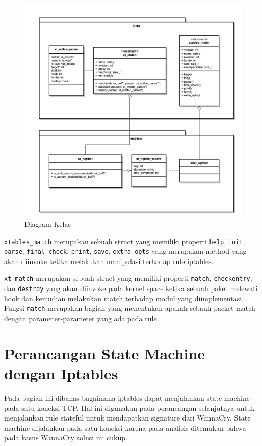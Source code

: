 \begin{figure}[H]
	\centering
	\includegraphics[width=\textwidth]{resources/ngfilter_class_diagram.png}
	\caption{Diagram Kelas}
	\label{fig:class_diagram}
\end{figure}

\verb|xtables_match| merupakan sebuah struct yang memiliki properti \verb|help|, \verb|init|, \verb|parse|, \verb|final_check|, \verb|print|, \verb|save|, \verb|extra_opts| yang merupakan method yang akan diinvoke ketika melakukan manipulasi terhadap rule iptables.

\verb|xt_match| merupakan sebuah struct yang memiliki properti \verb|match|, \verb|checkentry|, dan \verb|destroy| yang akan diinvoke pada kernel space ketika sebuah paket melewati hook dan kemudian melakukan match terhadap modul yang diimplementasi. Fungsi \verb|match| merupakan bagian yang menentukan apakah sebauh packet match dengan parameter-parameter yang ada pada rule.

\section{Perancangan State Machine dengan Iptables}

Pada bagian ini dibahas bagaimana iptables dapat menjalankan state machine pada satu koneksi TCP. Hal ini digunakan pada perancangan selanjutnya untuk menjalankan rule stateful untuk mendapatkan signature dari WannaCry. State machine dijalankan pada satu koneksi karena pada analisis ditemukan bahwa pada kasus WannaCry solusi ini cukup.

